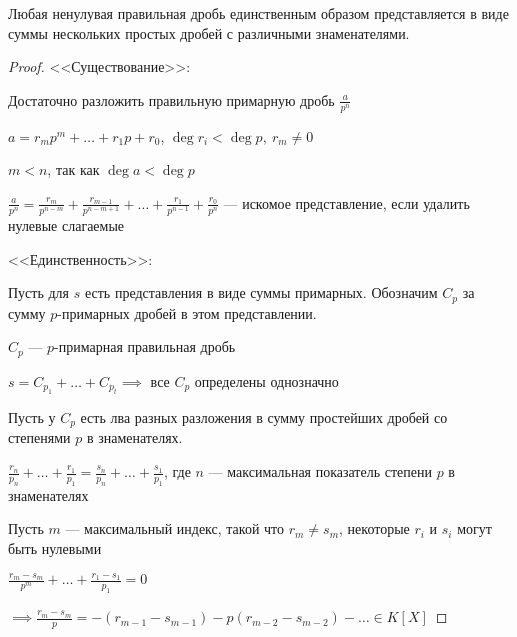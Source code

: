 \begin{theorem}
    Любая ненулувая правильная дробь единственным образом представляется в виде суммы нескольких простых дробей с различными знаменателями.
\end{theorem}

\begin{proof}
    <<Существование>>:

    Достаточно разложить правильную примарную дробь $\frac{a}{p^n}$

    $a = r_mp^m + \ldots + r_1p + r_0$, $\deg r_i < \deg p,~r_m \neq 0$

    $m < n$, так как $\deg a < \deg p$

    $\frac{a}{p^n} = \frac{r_m}{p^{n - m}} + \frac{r_{m-1}}{p^{n - m + 1}} + \ldots + \frac{r_1}{p^{n - 1}} + \frac{r_0}{p^n}$ --- искомое представление, если удалить нулевые слагаемые

    <<Единственность>>:

    Пусть для $s$ есть представления в виде суммы примарных. Обозначим $C_p$ за сумму $p$-примарных дробей в этом представлении.

    $C_p$ --- $p$-примарная правильная дробь

    $s = C_{p_1} + \ldots + C_{p_t} \implies$ все $C_p$ определены однозначно
    
    Пусть у $C_p$ есть лва разных разложения в сумму простейших дробей со степенями $p$ в знаменателях.

    $\frac{r_n}{p_n} + \ldots + \frac{r_1}{p_1} = \frac{s_n}{p_n} + \ldots + \frac{s_1}{p_1}$, где $n$ --- максимальная показатель степени $p$ в знаменателях

    Пусть $m$ --- максимальный индекс, такой что $r_m \neq s_m$, некоторые $r_i$ и $s_i$ могут быть нулевыми

    $\frac{r_m - s_m}{p^m} + \ldots + \frac{r_1 - s_1}{p_1} = 0$

    $\implies \frac{r_m - s_m}{p} = -(r_{m-1} - s_{m-1}) - p (r_{m-2} - s_{m-2}) - \ldots \in K[X]$
\end{proof}